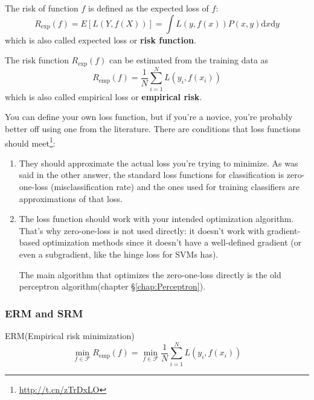 \begin{definition}
The risk of function $f$ is defined as the expected loss of $f$:
\begin{equation}\label{eqn:expected-loss}
R_{\mathrm{exp}}(f)=E\left[L\left(Y,f(X)\right)\right]=\int L\left(y,f(x)\right)P(x,y)\mathrm{d}x\mathrm{d}y
\end{equation}
which is also called expected loss or \textbf{risk function}.
\end{definition}

\begin{definition}
The risk function $R_{\mathrm{exp}}(f)$ can be estimated from the training data as
\begin{equation}
R_{\mathrm{emp}}(f)=\dfrac{1}{N}\sum\limits_{i=1}^{N} L\left(y_i,f(x_i)\right)
\end{equation}
which is also called empirical loss or \textbf{empirical risk}.
\end{definition}

You can define your own loss function, but if you're a novice, you're probably better off using one from the literature. There are conditions that loss functions should meet\footnote{\url{http://t.cn/zTrDxLO}}:
\begin{enumerate}
\item They should approximate the actual loss you're trying to minimize. As was said in the other answer, the standard loss functions for classification is zero-one-loss (misclassification rate) and the ones used for training classifiers are approximations of that loss.
\item The loss function should work with your intended optimization algorithm. That's why zero-one-loss is not used directly: it doesn't work with gradient-based optimization methods since it doesn't have a well-defined gradient (or even a subgradient, like the hinge loss for SVMs has).

The main algorithm that optimizes the zero-one-loss directly is the old perceptron algorithm(chapter \S \ref{chap:Perceptron}).
\end{enumerate}


\subsubsection{ERM and SRM}
\begin{definition}
ERM(Empirical risk minimization)
\begin{equation}
\min\limits _{f \in \mathcal{F}} R_{\mathrm{emp}}(f)=\min\limits _{f \in \mathcal{F}} \dfrac{1}{N}\sum\limits_{i=1}^{N} L\left(y_i,f(x_i)\right)
\end{equation}
\end{definition}

